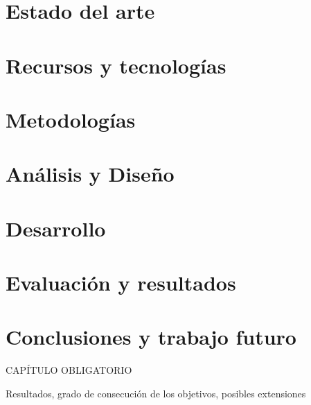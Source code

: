 \documentclass[oneside,12pt]{book}
\begin{document}
\chapter{Estado del arte}
\chapter{Recursos y tecnologías}
\chapter{Metodologías}
\chapter{Análisis y Diseño}
\chapter{Desarrollo}

\chapter{Evaluación y resultados}


\chapter{Conclusiones y trabajo futuro}
%
CAPÍTULO OBLIGATORIO

Resultados,  grado  de  consecución  de  los  objetivos,  posibles extensiones
\newpage


\end{document}
